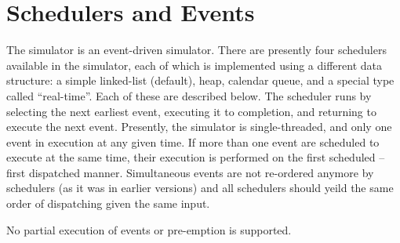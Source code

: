 \section{Schedulers and Events}
\label{sec:sched}

The simulator is an event-driven simulator.
There are presently four schedulers available in the simulator, each
of which is implemented using a different data structure:
a simple linked-list (default), heap, calendar queue, and a special
type called ``real-time''.  Each of these are described below.
The scheduler runs by selecting the next earliest event, executing
it to completion, and returning to execute the next event.
Presently, the simulator is single-threaded, and only one event
in execution at any given time.
If more than one event are scheduled to execute at the same time,
their execution is performed on the first scheduled -- first
dispatched manner.  Simultaneous events are not re-ordered anymore by
schedulers (as it was in earlier versions) and all schedulers should
yeild the same order of dispatching given the same input.
 
No partial execution of events or pre-emption is supported.

